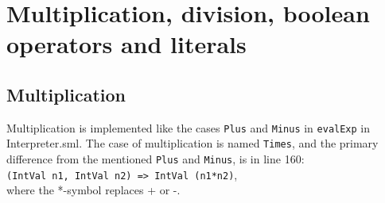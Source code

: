 \documentclass[11pt,a4paper]{article}
\theoremstyle{plain}
\theoremstyle{definition}
\theoremstyle{remark}
\numberwithin{equation}{section}
\begin{document}
	
	\clearpage\maketitle
	\thispagestyle{empty}
	
	\clearpage
	\newpage
	\thispagestyle{plain}
	
	\section{Multiplication, division, boolean operators and literals}
	
	\subsection{Multiplication}
	Multiplication is implemented like the cases \texttt{Plus} and \texttt{Minus} in \texttt{evalExp} in Interpreter.sml. The case of multiplication is named \texttt{Times}, and the primary difference from the mentioned \texttt{Plus} and \texttt{Minus}, is in line 160:\\
	\texttt{(IntVal n1, IntVal n2) => IntVal (n1*n2)},\\
	where the *-symbol replaces + or -.\\
	
\end{document}
